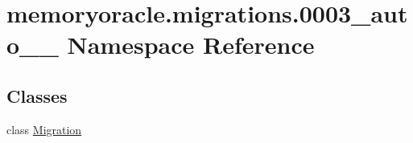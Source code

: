 \hypertarget{namespacememoryoracle_1_1migrations_1_10003__auto__20150402__2000}{}\section{memoryoracle.\+migrations.0003\+\_\+auto\+\_\+\_ Namespace Reference}
\label{namespacememoryoracle_1_1migrations_1_10003__auto__20150402__2000}
\subsection*{Classes}
\begin{DoxyCompactItemize}
\item 
class \hyperlink{classmemoryoracle_1_1migrations_1_10003__auto__20150402__2000_1_1Migration}{Migration}
\end{DoxyCompactItemize}
